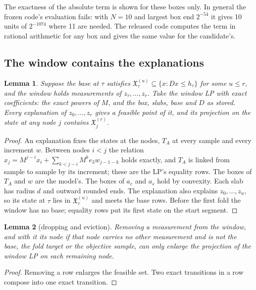 \documentclass[11pt,a4paper]{article}
\newtheorem{alemma}{Lemma}[section]
\begin{document}
The exactness of the absolute term is shown for these boxes only. In general the frozen code's evaluation fails: with
$N = 10$ and largest box end $2^{-54}$ it gives 10 units of $2^{-1074}$ where 11 are needed. The released code computes
the term in rational arithmetic for any box and gives the same value for the candidate's.

\subsection{The window contains the explanations}

\begin{alemma}\label{lem:embed}
Suppose the base at $\tau$ satisfies $\mathfrak{X}^{(u)}_\tau\subseteq\{x : Dx\le h_\tau\}$ for some $u\le r$, and the
window holds measurements of $z_{\tau},\dots,z_r$. Take the window LP with exact coefficients: the exact powers of $M$,
and the box, slabs, base and $D$ as stored. Every explanation of $z_0,\dots,z_r$ gives a feasible point of it, and its
projection on the state at any node $j$ contains $\mathfrak{X}^{(r)}_j$.
\end{alemma}
\begin{proof}
An explanation fixes the states at the nodes, $T_A$ at every sample and every increment $w$. Between nodes $i<j$ the
relation $x_j = M^{j-i}x_i + \sum_{k<j-i}M^k e_3 w_{j-1-k}$ holds exactly, and $T_A$ is linked from sample to sample
by its increment; these are the LP's equality rows. The boxes of $T_A$ and $w$ are the model's. The boxes of $a_c$ and
$a_s$ hold by convexity. Each slab has radius $d$ and outward rounded ends. The explanation also explains
$z_0,\dots,z_u$, so its state at $\tau$ lies in $\mathfrak{X}^{(u)}_\tau$ and meets the base rows. Before the first
fold the window has no base; equality rows put its first state on the start segment.
\end{proof}

\begin{alemma}[dropping and eviction]\label{lem:drop}
Removing a measurement from the window, and with it its node if that node carries no other measurement and is
not the base, the fold target or the objective sample, can only enlarge the
projection of the window LP on each remaining node.
\end{alemma}
\begin{proof}
Removing a row enlarges the feasible set. Two exact transitions in a row compose into one exact transition.
\end{proof}
\end{document}
